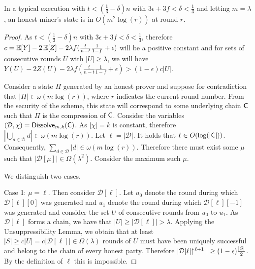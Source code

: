 \begin{theorem}[Succinctness]\label{thm.succinct}
	In a typical execution with $t < (\frac{1}{3} - \delta)n$ with
	$3\epsilon + 3f < \delta < \frac{1}{3}$ and letting $m = \lambda$,
	an honest miner's state is in $O(m^2\log(r))$ at round $r$.
\end{theorem}
\begin{proof}
	As $t < (\frac{1}{3} - \delta)n$ with
	$3\epsilon + 3f < \delta < \frac{1}{3}$, therefore
	$c = \operatorname{\mathbb{E}}[Y] - 2\operatorname{\mathbb{E}}[Z] - 2\lambda f(\frac{t}{n-t}\frac{1}{1-f} + \epsilon)$ will be
	a positive constant and for sets of consecutive rounds $U$ with
	$|U| \geq \lambda$,
	we will have
	$Y(U) - 2Z(U) - 2\lambda f(\frac{t}{n-t}\frac{1}{1-f} + \epsilon) > (1 - \epsilon)c|U|$.

	Consider a state $\Pi$ generated by an honest prover and suppose for
	contradiction that $|\Pi| \in \omega(m\log(r))$, where $r$ indicates the
	current round number. From the security of the
	scheme, this state will correspond to some underlying chain $\mathsf{C}$ such that
	$\Pi$ is the compression of $\mathsf{C}$. Consider the variables
	$(\mathcal{D}, \chi) = \textsf{Dissolve}_{m,k}(\mathsf{C})$. As $|\chi| = k$ is
	constant, therefore $|\bigcup_{d \in \mathcal{D}} d| \in \omega(m\log(r))$.
  Let $\ell = |\mathcal{D}|$.	It holds that $\ell \in O(\log(|\mathsf{C}|))$.
  Consequently, $\sum_{d \in \mathcal{D}} |d| \in \omega(m\log(r))$. Therefore
  there must exist some $\mu$ such that $|\mathcal{D}[\mu]| \in \Omega(\lambda^2)$.
	Consider the maximum such $\mu$.

	We distinguish two cases.

	Case 1: $\mu = \ell$. Then consider $\mathcal{D}[\ell]$.
	Let $u_0$ denote the round during which $\mathcal{D}[\ell][0]$ was generated
	and $u_1$ denote the round during which $\mathcal{D}[\ell][-1]$ was generated
	and consider the set $U$ of consecutive rounds from $u_0$ to $u_1$. As
	$\mathcal{D}[\ell]$ forms a chain, we have that
	$|U| \geq |\mathcal{D}[\ell]| > \lambda$. Applying the Unsuppressibility Lemma, we obtain
	that at least $|S| \geq c|U| = c|\mathcal{D}[\ell]| \in \Omega(\lambda)$
	rounds of $U$ must have been uniquely successful and belong to the chain of
	every honest party. Therefore $|\mathcal{D}[\ell]\negthickspace\uparrow^{\ell+1}| \geq (1 - \epsilon)\frac{|S|}{2}$. By the definition of $\ell$ this is impossible.


\end{proof}
